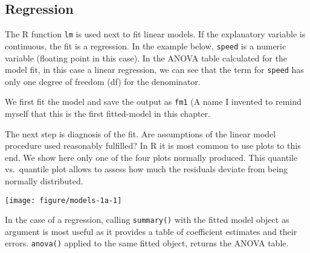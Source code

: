 \subsection{Regression}

The R function \texttt{lm} is used next to fit linear models. If the explanatory variable is continuous, the fit is a regression. In the example below, \texttt{speed} is a numeric variable (floating point in this case). In the ANOVA table calculated for the model fit, in this case a linear regression, we can see that the term for \texttt{speed} has only one degree of freedom (df) for the denominator.

We first fit the model and save the output as \texttt{fm1} (A name I invented to remind myself that this is the first fitted-model in this chapter.

\begin{knitrout}
\color{fgcolor}\begin{kframe}
\begin{alltt}
 \hlkwb{<-}  \hlopt{~}  
\end{alltt}
\end{kframe}
\end{knitrout}

The next step is diagnosis of the fit. Are assumptions of the linear model procedure used reasonably fulfilled? In R it is most common to use plots to this end. We show here only one of the four plots normally produced. This quantile vs.\ quantile plot allows to assess how much the residuals deviate from being normally distributed.

\begin{knitrout}
\color{fgcolor}\begin{kframe}
\begin{alltt}
  \hlstd{=} \hlstd{)}
\end{alltt}
\end{kframe}
\texttt{[image: figure/models-1a-1]} 

\end{knitrout}

In the case of a regression, calling \texttt{summary()} with the fitted model object as argument is most useful as it provides a table of coefficient estimates and their errors. \texttt{anova()} applied to the same fitted object, returns the ANOVA table.

